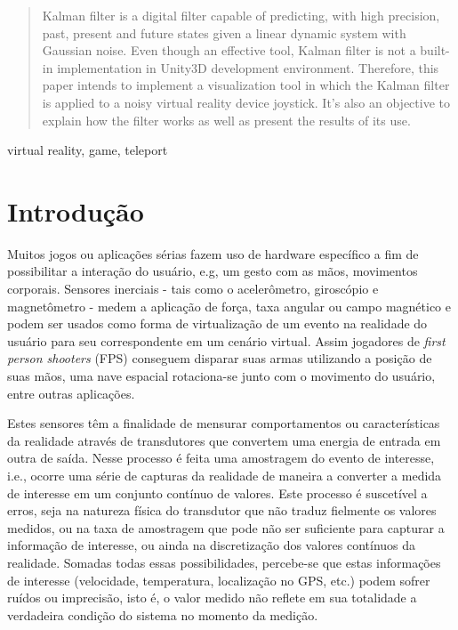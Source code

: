 \documentclass[conference]{IEEEtran}
\begin{document}
\begin{abstract}
Kalman filter is a digital filter capable of predicting, with high precision, past, present and future states given a linear dynamic system with Gaussian noise. Even though an effective tool, Kalman filter is not a built-in implementation in Unity3D development environment. Therefore, this paper intends to implement  a visualization tool in which the Kalman filter is applied to a noisy virtual reality device joystick. It's also an objective to explain how the filter works as well as present the results of its use.
\end{abstract}

\begin{IEEEkeywords}
virtual reality, game, teleport
\end{IEEEkeywords}

\section{Introdução}

Muitos jogos ou aplicações sérias fazem uso de hardware específico a fim de possibilitar a interação do usuário, e.g, um gesto com as mãos, movimentos corporais. Sensores inerciais - tais como o acelerômetro, giroscópio e magnetômetro - medem a aplicação de força, taxa angular ou campo magnético e podem ser usados como forma de virtualização de um evento na realidade do usuário para seu correspondente em um cenário virtual. Assim jogadores de \textit{first person shooters} (FPS) conseguem disparar suas armas utilizando a posição de suas mãos, uma nave espacial rotaciona-se junto com o movimento do usuário, entre outras aplicações.


Estes sensores têm a finalidade de mensurar comportamentos ou características da realidade através de transdutores que convertem uma energia de entrada em outra de saída. Nesse processo é feita uma amostragem do evento de interesse, i.e., ocorre uma série de capturas da realidade de maneira a converter a medida de interesse em um conjunto contínuo de valores. Este processo é suscetível a erros, seja na natureza física do transdutor que não traduz fielmente os valores medidos, ou na taxa de amostragem que pode não ser suficiente para capturar a informação de interesse, ou ainda na discretização dos valores contínuos da realidade. Somadas todas essas possibilidades, percebe-se que estas informações de interesse (velocidade, temperatura, localização no GPS, etc.) podem sofrer ruídos ou imprecisão, isto é, o valor medido não reflete em sua totalidade a verdadeira condição do sistema no momento da medição.
\end{document}

